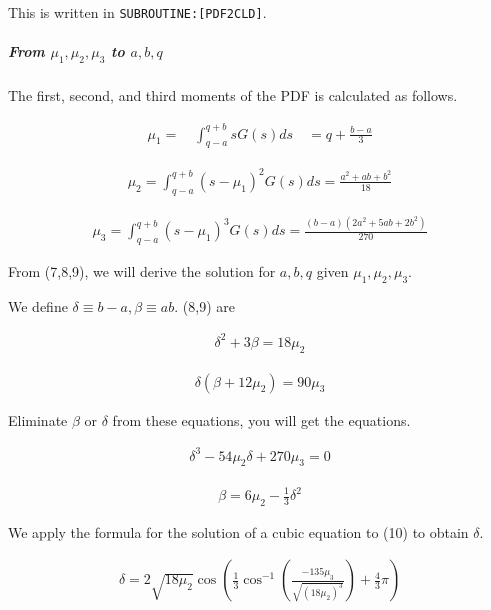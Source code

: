 This is written in \texttt{SUBROUTINE:{[}PDF2CLD{]}}.

\hypertarget{from-mu_1-mu_2-mu_3-to-abq}{%
\subparagraph{\texorpdfstring{From \(\mu_{1}, \mu_{2}, \mu_{3}\) to
\(a,b,q\)}{From \textbackslash mu\_\{1\}, \textbackslash mu\_\{2\}, \textbackslash mu\_\{3\} to a,b,q}}\label{from-mu_1-mu_2-mu_3-to-abq}}

The first, second, and third moments of the PDF is calculated as follows.

\begin{eqnarray}
\mu_{1}=\quad \int_{q-a}^{q+b}sG(s)ds \quad=q+\frac{b-a}{3}
\label{E08-7}
\end{eqnarray}

\begin{eqnarray}
\mu_{2}=\int_{q-a}^{q+b}\left(s-\mu_{1}\right)^{2} G(s)ds=\frac{a^{2}+a b+b^{2}}{18}
\label{E08-8}
\end{eqnarray}

\begin{eqnarray}
\mu_{3}=\int_{q-a}^{q+b}\left(s-\mu_{1}\right)^{3} G(s)ds=\frac{(b-a)\left(2 a^{2}+5 a b+2 b^{2}\right)}{270}
\label{E08-9}
\end{eqnarray}

From (7,8,9), we will derive the solution for \(a,b , q\) given \(\mu_{1}, \mu_{2}, \mu_{3}\).

We define \(\delta \equiv b-a, \beta \equiv a b\). (8,9) are

\begin{eqnarray}
\delta^{2}+3 \beta=18 \mu_{2}
\end{eqnarray}

\begin{eqnarray}
\delta\left(\beta+12 \mu_{2}\right)=90 \mu_{3}
\end{eqnarray}

Eliminate \(\beta\) or \(\delta\) from these equations, you will get the equations.

\begin{eqnarray}
\delta^{3}-54 \mu_{2} \delta+270 \mu_{3}=0
\label{E08-10}
\end{eqnarray}

\begin{eqnarray}
\beta=6 \mu_{2}-\frac{1}{3} \delta^{2}
\label{E08-11}
\end{eqnarray}

We apply the formula for the solution of a cubic equation to (10) to obtain \(\delta\).

\begin{eqnarray}
\delta=2 \sqrt{18 \mu_{2}} \cos \left(\frac{1}{3} \cos ^{-1}\left(\frac{-135 \mu_{3}}{\sqrt{\left(18 \mu_{2}\right)^{3}}}\right)+\frac{4}{3} \pi\right)
\end{eqnarray}

